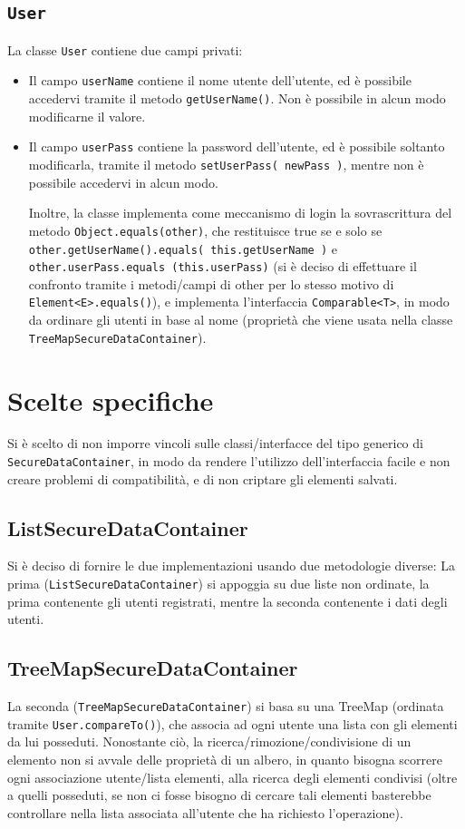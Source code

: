 \documentclass{article}
\begin{document}
\subsection{\texttt{User}}
La classe \texttt{User} contiene due campi privati:
\begin{itemize}
\item Il campo \texttt{userName} contiene il nome utente dell'utente, ed è possibile accedervi tramite il metodo \texttt{getUserName()}. Non è possibile in alcun modo modificarne il valore.

\item Il campo \texttt{userPass} contiene la password dell'utente, ed è possibile soltanto modificarla,  tramite il metodo \texttt{setUserPass( newPass )}, mentre non è possibile accedervi in alcun modo.

Inoltre, la classe implementa come meccanismo di login la sovrascrittura del metodo \texttt{Object.equals(other)}, che restituisce true se e solo se \texttt{other.getUserName().equals( this.getUserName )} e \newline
\texttt{other.userPass.equals (this.userPass)} (si è deciso di effettuare il confronto tramite i metodi/campi di other per lo stesso motivo di   \newline\texttt{Element<E>.equals()}), e implementa l'interfaccia \texttt{Comparable<T>}, in modo da ordinare gli utenti in base al nome (proprietà che viene usata nella classe \texttt{TreeMapSecureDataContainer}).
\end{itemize}

\section{Scelte specifiche}
Si è scelto di non imporre vincoli sulle classi/interfacce del tipo generico di \texttt{SecureDataContainer}, in modo da rendere l'utilizzo dell'interfaccia facile e non creare problemi di compatibilità, e di non criptare gli elementi salvati.
\subsection{ListSecureDataContainer}
Si è deciso di fornire le due implementazioni usando due metodologie diverse:
La prima (\texttt{ListSecureDataContainer}) si appoggia su due liste non ordinate, la prima contenente gli utenti registrati, mentre la seconda contenente i dati degli utenti.


\subsection{TreeMapSecureDataContainer}
La seconda (\texttt{TreeMapSecureDataContainer}) si basa su una TreeMap (ordinata tramite \texttt{User.compareTo()}), che associa ad ogni utente una lista con gli elementi da lui posseduti.
Nonostante ciò, la ricerca/rimozione/condivisione di un elemento non si avvale delle proprietà di un albero, in quanto bisogna scorrere ogni associazione utente/lista elementi, alla ricerca degli elementi condivisi (oltre a quelli posseduti, se non ci fosse bisogno di cercare tali elementi basterebbe controllare nella lista associata all'utente che ha richiesto l'operazione).
\end{document}
